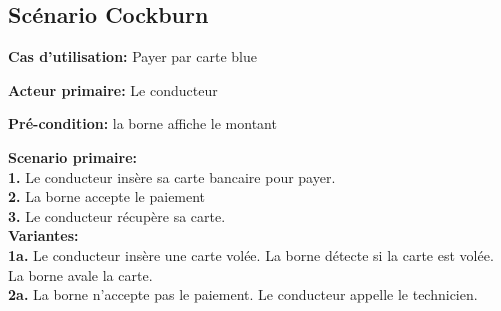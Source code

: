 \subsection{Scénario Cockburn}
\textbf{Cas d'utilisation:} Payer par carte blue

\textbf{Acteur primaire:} Le conducteur


\textbf{Pré-condition: } la borne affiche le montant

 

\textbf{Scenario primaire: } \\
    \textbf{1.} Le conducteur insère sa carte bancaire pour payer. \\ %
    \textbf{2.} La borne accepte le paiement \\
    \textbf{3.} Le conducteur récupère sa carte.\\

\textbf{Variantes:}\\
    \textbf{1a.} Le conducteur insère une carte volée. La borne détecte si la carte est volée. La borne avale la carte.\\
    \textbf{2a.} La borne n’accepte pas le paiement. Le conducteur appelle le technicien. \\
    
\newpage
